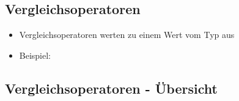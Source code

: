 \subsection{Vergleichsoperatoren}
\begin{frame}
    \slidehead

    \begin{itemize}
        \item Vergleichsoperatoren werten zu einem Wert vom Typ  aus
        \item Beispiel:
    \end{itemize}
\end{frame}


\subsection{Vergleichsoperatoren - Übersicht}
